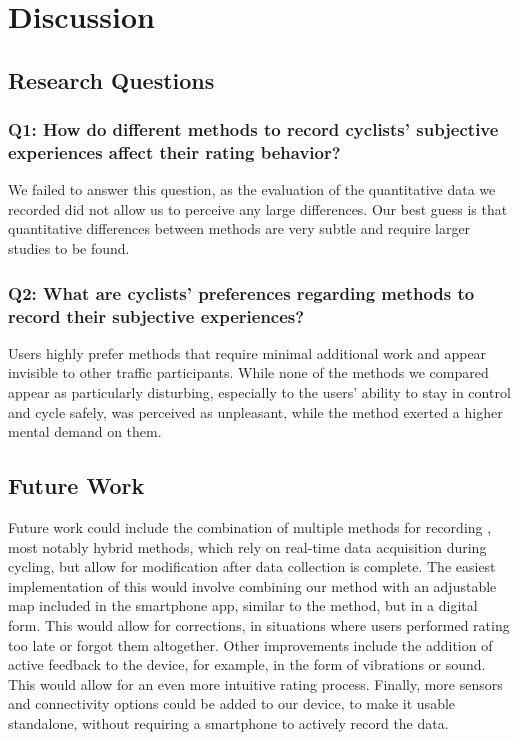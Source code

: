 \section{Discussion}\label{sec:discussion}

\subsection{Research Questions}

\subsubsection{Q1: How do different methods to record cyclists' subjective experiences affect their
rating behavior?}

We failed to answer this question, as the evaluation of the quantitative data we recorded did not allow us to perceive any large differences.
Our best guess is that quantitative differences between methods are very subtle and require larger studies to be found.

\subsubsection{Q2: What are cyclists' preferences regarding methods to record their subjective experiences?}

Users highly prefer methods that require minimal additional work and appear invisible to other traffic participants.
While none of the methods we compared appear as particularly disturbing, especially to the users' ability to stay in control and cycle safely, \audiorecording was perceived as unpleasant, while the \mapping method exerted a higher mental demand on them.

\subsection{Future Work}

Future work could include the combination of multiple methods for recording \CSE, most notably hybrid methods, which rely on real-time data acquisition during cycling, but allow for modification after data collection is complete.
The easiest implementation of this would involve combining our \likertshift method with an adjustable map included in the smartphone app, similar to the \mapping method, but in a digital form.
This would allow for corrections, in situations where users performed rating too late or forgot them altogether.
Other improvements include the addition of active feedback to the device, for example, in the form of vibrations or sound.
This would allow for an even more intuitive rating process.
Finally, more sensors and connectivity options could be added to our \likertshift device, to make it usable standalone, without requiring a smartphone to actively record the data.
